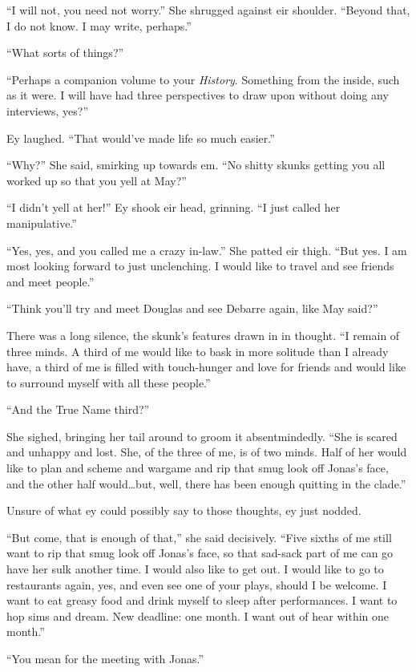 ``I will not, you need not worry.'' She shrugged against eir shoulder. ``Beyond that, I do not know. I may write, perhaps.''

``What sorts of things?''

``Perhaps a companion volume to your \emph{History}. Something from the inside, such as it were. I will have had three perspectives to draw upon without doing any interviews, yes?''

Ey laughed. ``That would've made life so much easier.''

``Why?'' She said, smirking up towards em. ``No shitty skunks getting you all worked up so that you yell at May?''

``I didn't yell at her!'' Ey shook eir head, grinning. ``I just called her manipulative.''

``Yes, yes, and you called me a crazy in-law.'' She patted eir thigh. ``But yes. I am most looking forward to just unclenching. I would like to travel and see friends and meet people.''

``Think you'll try and meet Douglas and see Debarre again, like May said?''

There was a long silence, the skunk's features drawn in in thought. ``I remain of three minds. A third of me would like to bask in more solitude than I already have, a third of me is filled with touch-hunger and love for friends and would like to surround myself with all these people.''

``And the True Name third?''

She sighed, bringing her tail around to groom it absentmindedly. ``She is scared and unhappy and lost. She, of the three of me, is of two minds. Half of her would like to plan and scheme and wargame and rip that smug look off Jonas's face, and the other half would\ldots but, well, there has been enough quitting in the clade.''

Unsure of what ey could possibly say to those thoughts, ey just nodded.

``But come, that is enough of that,'' she said decisively. ``Five sixths of me still want to rip that smug look off Jonas's face, so that sad-sack part of me can go have her sulk another time. I would also like to get out. I would like to go to restaurants again, yes, and even see one of your plays, should I be welcome. I want to eat greasy food and drink myself to sleep after performances. I want to hop sims and dream. New deadline: one month. I want out of hear within one month.''

``You mean for the meeting with Jonas.''


